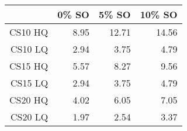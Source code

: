 \begin{table}[ht]
\begin{center}
\begin{tabular}{rrrr}
  \hline
 & 0\% SO & 5\% SO & 10\% SO \\
  \hline
CS10 HQ & 8.95 & 12.71 & 14.56 \\
  CS10 LQ & 2.94 & 3.75 & 4.79 \\
  CS15 HQ & 5.57 & 8.27 & 9.56 \\
  CS15 LQ & 2.94 & 3.75 & 4.79 \\
  CS20 HQ & 4.02 & 6.05 & 7.05 \\
  CS20 LQ & 1.97 & 2.54 & 3.37 \\
   \hline
\end{tabular}
\end{center}
\end{table}
